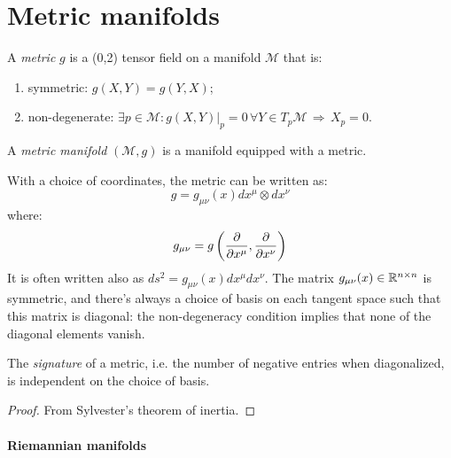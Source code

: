 
\section{Metric manifolds}

\begin{definition}
  A \textit{metric} $ g $ is a (0,2) tensor field on a manifold $ \mathcal{M} $ that is:
  \begin{enumerate}
    \item symmetric: $ g(X,Y) = g(Y,X) $;
    \item non-degenerate: $ \exists p \in \mathcal{M} : g(X,Y)\vert_p = 0 \,\forall Y \in T_p \mathcal{M} \,\Rightarrow\, X_p = 0 $.
  \end{enumerate}
\end{definition}

\begin{definition}
  A \textit{metric manifold} $ (\mathcal{M},g) $ is a manifold equipped with a metric.
\end{definition}

With a choice of coordinates, the metric can be written as:
\begin{equation}
  g = g_{\mu \nu}(x) dx^{\mu} \otimes dx^{\nu}
  \label{eq:3.1}
\end{equation}
where:
\begin{equation}
  g_{\mu \nu} = g\left( \frac{\partial}{\partial x^{\mu}}, \frac{\partial}{\partial x^{\nu}} \right)
  \label{eq:3.2}
\end{equation}
It is often written also as $ ds^2 = g_{\mu \nu}(x) dx^{\mu} dx^{\nu} $. The matrix $ g_{\mu \nu}(x) \in \mathbb{R}^{n \times n} $ is symmetric, and there's always a choice of basis on each tangent space such that this matrix is diagonal: the non-degeneracy condition implies that none of the diagonal elements vanish.

\begin{proposition}
  The \textit{signature} of a metric, i.e. the number of negative entries when diagonalized, is independent on the choice of basis.
\end{proposition}
\begin{proof}
  From Sylvester's theorem of inertia.
\end{proof}

\paragraph{Riemannian manifolds}

